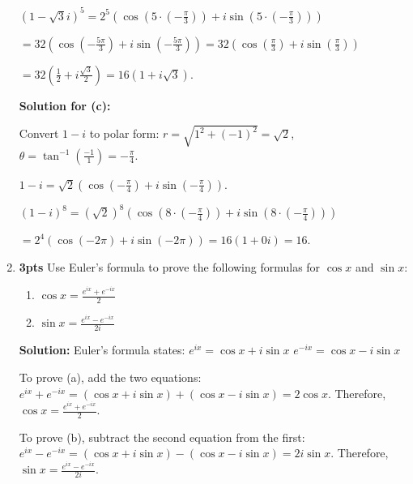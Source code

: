 \documentclass[nohyper,nobib,xcolor=dvipsnames,svgnames,x11names]{tufte-book}
\begin{document}
\begin{enumerate}
    $(1-\sqrt{3}i)^5 = 2^5(\cos(5\cdot(-\frac{\pi}{3}))+i\sin(5\cdot(-\frac{\pi}{3})))$

    $= 32(\cos(-\frac{5\pi}{3})+i\sin(-\frac{5\pi}{3})) = 32(\cos(\frac{\pi}{3})+i\sin(\frac{\pi}{3}))$

    $= 32(\frac{1}{2}+i\frac{\sqrt{3}}{2}) = 16(1+i\sqrt{3})$.

    \textbf{Solution for (c):}
    
    Convert $1-i$ to polar form: $r=\sqrt{1^2+(-1)^2}=\sqrt{2}$, $\theta=\tan^{-1}(\frac{-1}{1})=-\frac{\pi}{4}$.

    $1-i = \sqrt{2}(\cos(-\frac{\pi}{4})+i\sin(-\frac{\pi}{4}))$.

    $(1-i)^8 = (\sqrt{2})^8(\cos(8\cdot(-\frac{\pi}{4}))+i\sin(8\cdot(-\frac{\pi}{4})))$

    $= 2^4(\cos(-2\pi)+i\sin(-2\pi)) = 16(1+0i)=16$.

    \item \textbf{3pts} Use Euler's formula to prove the following formulas for $\cos x$ and $\sin x$:
    \begin{enumerate}
        \item $\cos x = \frac{e^{ix}+e^{-ix}}{2}$
        \item $\sin x = \frac{e^{ix}-e^{-ix}}{2i}$
    \end{enumerate}
    \textbf{Solution:}
    Euler's formula states:
    $e^{ix} = \cos x + i\sin x$
    $e^{-ix} = \cos x - i\sin x$

    To prove (a), add the two equations:
    $e^{ix}+e^{-ix} = (\cos x + i\sin x) + (\cos x - i\sin x) = 2\cos x$.
    Therefore, $\cos x = \frac{e^{ix}+e^{-ix}}{2}$.

    To prove (b), subtract the second equation from the first:
    $e^{ix}-e^{-ix} = (\cos x + i\sin x) - (\cos x - i\sin x) = 2i\sin x$.
    Therefore, $\sin x = \frac{e^{ix}-e^{-ix}}{2i}$.

\end{enumerate}

\end{document}
